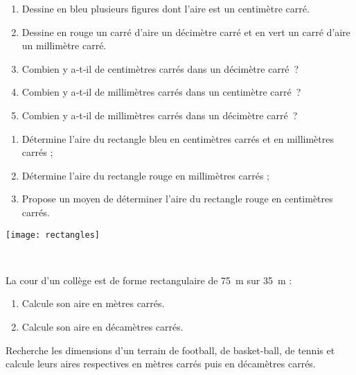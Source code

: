 \begin{activite}
\begin{partie}
\begin{enumerate}
 \item Dessine en bleu plusieurs figures dont l'aire est un centimètre carré.
 \item Dessine en rouge un carré d'aire un décimètre carré et en vert un carré d'aire un millimètre carré.
 \item Combien y a‑t‑il de centimètres carrés dans un décimètre carré ?
 \item Combien y a‑t‑il de millimètres carrés dans un centimètre carré ?
 \item Combien y a‑t‑il de millimètres carrés dans un décimètre carré ?
 \end{enumerate}
\end{partie}

\begin{partie}
\begin{minipage}[c]{0.36\linewidth}
\begin{enumerate}
 \item Détermine l'aire du rectangle bleu en centimètres carrés et en millimètres carrés ;
 \item Détermine l'aire du rectangle rouge en millimètres carrés ;
 \item Propose un moyen de déterminer l'aire du rectangle rouge en centimètres carrés.
 \end{enumerate}
 \end{minipage} \hfill%
 \begin{minipage}[c]{0.6\linewidth}
  \texttt{[image: rectangles]}
  \end{minipage} \\
\end{partie}

\begin{partie}
La cour d'un collège est de forme rectangulaire de 75 m sur 35 m :
\begin{enumerate}
 \item Calcule son aire en mètres carrés.
 \item Calcule son aire en décamètres carrés.
 \end{enumerate}
\end{partie}

\begin{partie}
Recherche les dimensions d'un terrain de football, de basket-ball, de tennis et calcule leurs aires respectives en mètres carrés puis en décamètres carrés.
\end{partie}

\end{activite}

